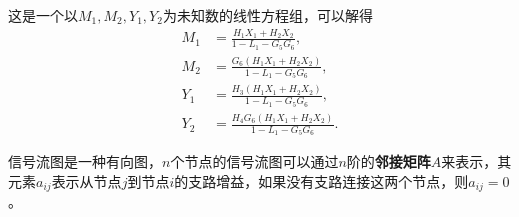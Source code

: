 \begin{example}
    这是一个以$M_1,M_2,Y_1,Y_2$为未知数的线性方程组，可以解得
    \begin{equation}
        \begin{aligned}
            M_1&=\frac{H_1 X_1+H_2 X_2}{1-L_1-G_5 G_6},\\
            M_2&=\frac{G_6(H_1 X_1+H_2 X_2)}{1-L_1-G_5 G_6},\\
            Y_1&=\frac{H_3(H_1 X_1+H_2 X_2)}{1-L_1-G_5 G_6},\\
            Y_2&=\frac{H_4 G_6(H_1 X_1+H_2 X_2)}{1-L_1-G_5 G_6}.
        \end{aligned}
    \end{equation}
\end{example}

信号流图是一种有向图，$n$个节点的信号流图可以通过$n$阶的\textbf{邻接矩阵}$A$来表示，其元素$a_{ij}$表示从节点$j$到节点$i$的支路增益，如果没有支路连接这两个节点，则$a_{ij}=0$。

